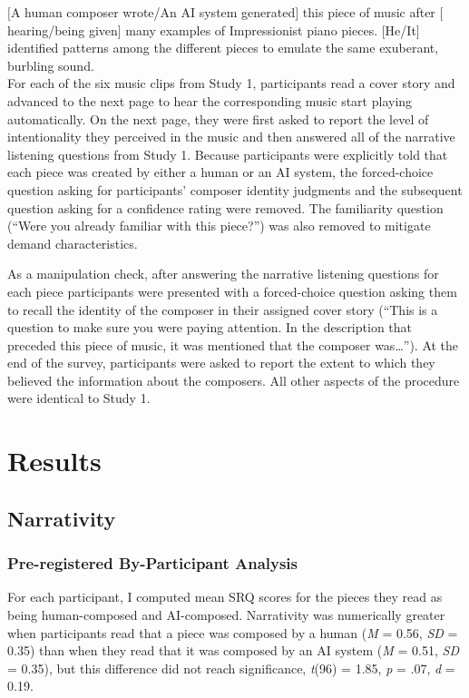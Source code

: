 \documentclass[12pt,twoside]{reedthesis}
\begin{document}
$[$A human composer wrote/An AI system generated$]$ this piece of music after $[$hearing/being given$]$ many examples of Impressionist piano pieces. $[$He/It$]$ identified patterns among the different pieces to emulate the same exuberant, burbling sound.
\\

For each of the six music clips from Study 1, participants read a cover story and advanced to the next page to hear the corresponding music start playing automatically. On the next page, they were first asked to report the level of intentionality they perceived in the music and then answered all of the narrative listening questions from Study 1. Because participants were explicitly told that each piece was created by either a human or an AI system, the forced-choice question asking for participants’ composer identity judgments and the subsequent question asking for a confidence rating were removed. The familiarity question (“Were you already familiar with this piece?”) was also removed to mitigate demand characteristics. 

As a manipulation check, after answering the narrative listening questions for each piece participants were presented with a forced-choice question asking them to recall the identity of the composer in their assigned cover story (“This is a question to make sure you were paying attention. In the description that preceded this piece of music, it was mentioned that the composer was…”). At the end of the survey, participants were asked to report the extent to which they believed the information about the composers. All other aspects of the procedure were identical to Study 1.

\section*{Results}
\subsection*{Narrativity}
\subsubsection*{Pre-registered By-Participant Analysis}
For each participant, I computed mean SRQ scores for the pieces they read as being human-composed and AI-composed. Narrativity was numerically greater when participants read that a piece was composed by a human (\emph{M} = 0.56, \emph{SD} = 0.35) than when they read that it was composed by an AI system (\emph{M} = 0.51, \emph{SD} = 0.35), but this difference did not reach significance, \emph{t}(96) = 1.85, \emph{p} = .07, \emph{d} = 0.19.
\end{document}
